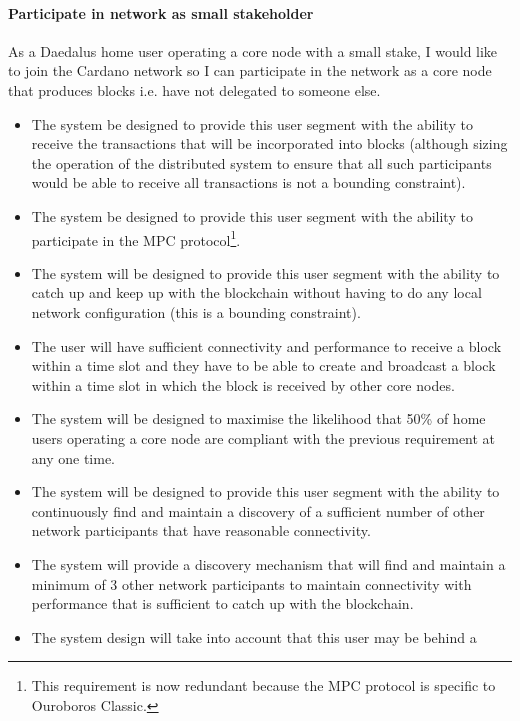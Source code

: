 \documentclass{report}
\theoremstyle{definition}{
  \newtheorem{lemma}{Lemma}[section] %
  \newtheorem{definition}[lemma]{Definition}
}
\theoremstyle{theorem}{
  \newtheorem{invariant}[lemma]{Invariant}
  \newtheorem{proofobligation}[lemma]{Proof Obligation}
}
\numberwithin{equation}{lemma}
\begin{document}
\paragraph{Participate in network as small stakeholder}

As a Daedalus home user operating a core node with a small stake, I would like
to join the Cardano network so I can participate in the network as a core node
that produces blocks i.e. have not delegated to someone else.

\begin{itemize}
\item The system be designed to provide this user segment with the ability to
      receive the transactions that will be incorporated into blocks (although
      sizing the operation of the distributed system to ensure that all such
      participants would be able to receive all transactions is not a bounding
      constraint).
\item The system be designed to provide this user segment with the ability to
      participate in the MPC protocol\footnote{This requirement is now
      redundant because the MPC protocol is specific to Ouroboros Classic.}.
\item The system will be designed to provide this user segment with the ability
      to catch up and keep up with the blockchain without having to do any local
      network configuration (this is a bounding constraint).
\item The user will have sufficient connectivity and performance to receive a
      block within a time slot {\sc and} they have to be able to create and
      broadcast a block within a time slot in which the block is received by
      other core nodes.
\item The system will be designed to maximise the likelihood that 50\% of home
      users operating a core node are compliant with the previous requirement
      at any one time.
\item The system will be designed to provide this user segment with the ability
      to continuously find and maintain a discovery of a sufficient number of
      other network participants that have reasonable connectivity.
\item The system will provide a discovery mechanism that will find and maintain
      a minimum of 3 other network participants to maintain connectivity with
      performance that is sufficient to catch up with the blockchain.
\item The system design will take into account that this user may be behind a

\end{itemize}
\end{document}
